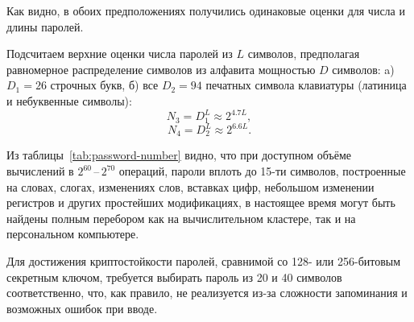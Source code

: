 Как видно, в обоих предположениях получились одинаковые оценки для числа и длины паролей.

Подсчитаем верхние оценки числа паролей из $L$ символов, предполагая равномерное распределение символов из алфавита мощностью $D$ символов: a) $D_1 = 26$ строчных букв, б) все $D_2 = 94$ печатных символа клавиатуры (латиница и небуквенные символы):
    \[ N_3 = D_1^L \approx 2^{4.7 L}, \]
    \[ N_4 = D_2^L \approx 2^{6.6 L}. \]

\begin{table}[!ht]
    \caption{Различные верхние оценки числа паролей\label{tab:password-number}}
\end{table}

Из таблицы~\ref{tab:password-number} видно, что при доступном объёме вычислений в $2^{60}$\,--\,$2^{70}$ операций, пароли вплоть до 15-ти символов, построенные на словах, слогах, изменениях слов, вставках цифр, небольшом изменении регистров и других простейших модификациях, в настоящее время могут быть найдены полным перебором как на вычислительном кластере, так и на персональном компьютере.

Для достижения криптостойкости паролей, сравнимой со 128- или 256-битовым секретным ключом, требуется выбирать пароль из 20 и 40 символов соответственно, что, как правило, не реализуется из-за сложности запоминания и возможных ошибок при вводе.


